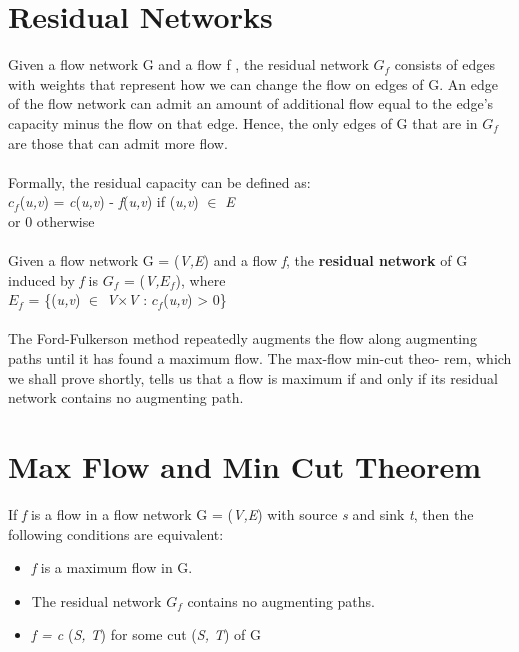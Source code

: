 \documentclass[12pt, letterpaper]{article}
\begin{document}
\section{Residual Networks}
Given a flow network G and a flow f , the residual network $G_f$ consists of edges with weights that represent how we can change the flow on edges of G. An edge of the flow network can admit an amount of additional flow equal to the edge’s capacity minus the flow on that edge. Hence, the only edges of G that are in $G_f$ are those that can admit more flow.\\\\
Formally, the residual capacity can be defined as:\\
$c_f$(\textit{u,v}) = \textit{c}(\textit{u,v}) - \textit{f}(\textit{u,v}) if (\textit{u,v}) $\in$ \textit{E}\\
or 0 otherwise \\\\
Given a flow network G = (\textit{V,E}) and a flow \textit{f}, the \textbf{residual network} of G induced by \textit{f} is $G_f$ = (\textit{V,$E_f$}), where\\
$E_f$ = \{(\textit{u,v}) $\in$ \textit{V$\times$V} : $c_f$(\textit{u,v}) > 0\} \\\\
The Ford-Fulkerson method repeatedly augments the flow along augmenting paths until it has found a maximum flow. The max-flow min-cut theo- rem, which we shall prove shortly, tells us that a flow is maximum if and only if its residual network contains no augmenting path.

\section{Max Flow and Min Cut Theorem}

If \textit{f} is a flow in a flow network G = (\textit{V,E}) with source \textit{s} and sink \textit{t}, then the following conditions are equivalent:\\
\begin{itemize}
	\item \textit{f} is a maximum flow in G.
	\item The residual network $G_f$ contains no augmenting paths.
	\item \textit{f = c} (\textit{S, T}) for some cut (\textit{S, T}) of G
\end{itemize}
\end{document}
